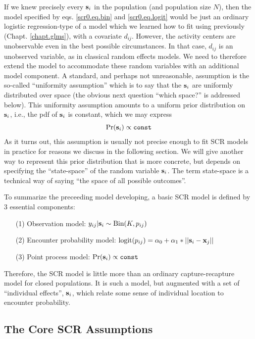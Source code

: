 If we knew precisely every ${\bf s}_{i}$ in the population (and
population size $N$), then the model specified by
eqs. \ref{scr0.eq.bin} and \ref{scr0.eq.logit} would be just an
ordinary logistic regression-type of a model which we learned how to
fit using \winbugs previously (Chapt. \ref{chapt.glms}), with a
covariate $d_{ij}$. However, the activity centers are unobservable
even in the best possible circumstances. In that case, $d_{ij}$ is an
unobserved variable, as in classical random effects models. We need to
therefore extend the model to accommodate these random variables with
an additional model component. A standard, and perhaps not
unreasonable, assumption is the so-called ``uniformity assumption''
which is to say that the ${\bf s}_{i}$ are uniformly distributed over
space (the obvious next question ``which space?'' is addressed below).
This uniformity assumption amounts to a uniform prior distribution on
${\bf s}_{i}$, i.e., the pdf of ${\bf s}_{i}$ is constant, which we
may express
\begin{equation}
	\Pr({\bf s}_{i}) \propto \mbox{\tt const}
\label{scr0.eq.sprior}
\end{equation}
 As it turns out, this assumption is usually not precise
enough to fit SCR models in practice for reasons we discuss in the
following section.  We will give another way to represent this prior
distribution that is more concrete, but depends on specifying the
``state-space'' of the random variable ${\bf s}_{i}$. The term
state-space is a technical way of saying ``the space of all possible outcomes''.

To summarize the preceeding model developing, a basic SCR model is
defined by 3 essential components:
\begin{itemize}
\item[(1)] Observation model: $y_{ij}|{\bf s}_{i} \sim \mbox{Bin}(K, p_{ij})$
\item[(2)] Encounter probability model: $\mbox{logit}(p_{ij}) = \alpha_{0} +
  \alpha_{1}*||{\bf s}_{i}-{\bf x}_{j}||$
\item[(3)] Point process model: $\Pr({\bf s}_{i} ) \propto \mbox{\tt const}$
\end{itemize}
Therefore, the SCR model is little more than an ordinary
capture-recapture model for closed populations. It is such a model,
but augmented with a set of ``individual effects'', ${\bf s}_{i}$,
which relate some sense of individual location to encounter
probability. 

\subsection{The Core SCR Assumptions}

